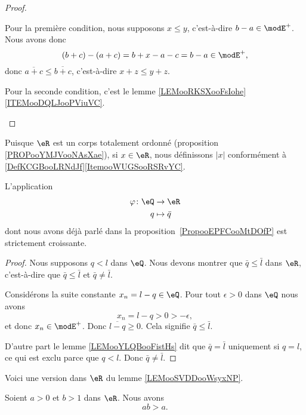\begin{proof}
\begin{subproof}
		Pour la première condition, nous supposons \( x\leq y\), c'est-à-dire \( b-a\in \modE^+\). Nous avons donc
		\begin{equation}
			(b+c)-(a+c)=b+x-a-c=b-a\in \modE^+,
		\end{equation}
		donc \( \overline{ a+c }\leq \overline{ b+c }\), c'est-à-dire \( x+z\leq y+z\).

		Pour la seconde condition, c'est le lemme \ref{LEMooRKSXooFsIohe}\ref{ITEMooDQLJooPViuVC}.
	\end{subproof}
\end{proof}


\begin{definition}
	Puisque \( \eR\) est un corps totalement ordonné (proposition \ref{PROPooYMJVooNAsXae}), si \( x\in \eR\), nous définissons \( | x |\) conformément à \ref{DefKCGBooLRNdJf}\ref{ItemooWUGSooRSRvYC}.
\end{definition}

\begin{lemma}       \label{LEMooTJAXooKEqPCG}
	L'application
	\begin{equation}
		\begin{aligned}
			\varphi\colon \eQ & \to \eR        \\
			q                 & \mapsto \bar q
		\end{aligned}
	\end{equation}
	dont nous avons déjà parlé dans la proposition~\ref{PropooEPFCooMtDOfP} est strictement croissante.
\end{lemma}

\begin{proof}
	Nous supposons \( q< l\) dans \( \eQ\). Nous devons montrer que \( \bar q\leq \bar l\) dans \( \eR\), c'est-à-dire que \( \bar q\leq \bar l\) et \( \bar q\neq \bar l\).

	Considérons la suite constante \( x_n=l-q\in \eQ\). Pour tout \( \epsilon>0\) dans \( \eQ\) nous avons
	\begin{equation}
		x_n=l-q>0>-\epsilon,
	\end{equation}
	et donc \( x_n\in\modE^+\). Donc \( \overline{ l-q }\geq 0\). Cela signifie \( \bar q\leq \bar l\).

	D'autre part le lemme \ref{LEMooYLQBooFistHs} dit que \( \bar q=\bar l\) uniquement si \( q=l\), ce qui est exclu parce que \( q<l\). Donc \( \bar q\neq\bar l\).
\end{proof}

Voici une version dans \( \eR\) du lemme \ref{LEMooSVDDooWsyxNP}.
\begin{lemma}       \label{LEMooKAXFooIPyzJC}
	Soient \( a>0\) et \( b>1\) dans \( \eR\). Nous avons
	\begin{equation}
		ab>a.
	\end{equation}
\end{lemma}

